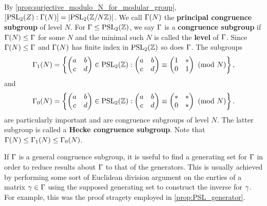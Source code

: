         By \cref{prop:surjective_modulo_N_for_modular_group}, $[\mathrm{PSL}_{2}(Z):\Gamma(N)] = |\mathrm{PSL}_{2}(\mathbb{Z}/N\mathbb{Z})|$. We call $\Gamma(N)$ the \textbf{principal congruence subgroup} of level $N$. For $\Gamma \le \mathrm{PSL}_{2}(\mathbb{Z})$, we say $\Gamma$ is a \textbf{congruence subgroup} if $\Gamma(N) \le \Gamma$ for some $N$ and the minimal such $N$ is called the \textbf{level} of $\Gamma$. Since $\Gamma(N) \le \Gamma$ and $\Gamma(N)$ has finite index in $\mathrm{PSL}_{2}(\mathbb{Z})$ so does $\Gamma$. The subgroups
      \[
        \Gamma_{1}(N) = \left\{\begin{pmatrix} a & b \\ c & d \end{pmatrix} \in \mathrm{PSL}_{2}(\mathbb{Z}):\begin{pmatrix} a & b \\ c & d \end{pmatrix} \equiv \begin{pmatrix} 1 & \ast \\ 0 & 1 \end{pmatrix} \ \left(\text{mod }N\right)\right\},
      \]
      and
      \[
        \Gamma_{0}(N) = \left\{\begin{pmatrix} a & b \\ c & d \end{pmatrix} \in \mathrm{PSL}_{2}(\mathbb{Z}):\begin{pmatrix} a & b \\ c & d \end{pmatrix} \equiv \begin{pmatrix} \ast & \ast \\ 0 & \ast \end{pmatrix} \ \left(\text{mod }N\right)\right\}.
      \]
      are particularly important and are congruence subgroups of level $N$. The latter subgroup is called a \textbf{Hecke congruence subgroup}. Note that $\Gamma(N) \le \Gamma_{1}(N) \le \Gamma_{0}(N)$.

      If $\Gamma$ is a general congruence subgroup, it is useful to find a generating set for $\Gamma$ in order to reduce results about $\Gamma$ to that of the generators. This is usually achieved by performing some sort of Euclidean division argument on the enrties of a matrix $\gamma \in \Gamma$ using the supposed generating set to construct the inverse for $\gamma$. For example, this was the proof stragety employed in \cref{prop:PSL_generator}.
